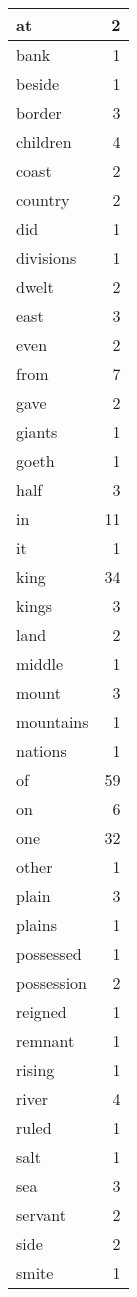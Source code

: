 \begin{center}
\begin{longtable}{l|r}
at & 2 \\ \hline
bank & 1 \\ \hline
beside & 1 \\ \hline
border & 3 \\ \hline
children & 4 \\ \hline
coast & 2 \\ \hline
country & 2 \\ \hline
did & 1 \\ \hline
divisions & 1 \\ \hline
dwelt & 2 \\ \hline
east & 3 \\ \hline
even & 2 \\ \hline
from & 7 \\ \hline
gave & 2 \\ \hline
giants & 1 \\ \hline
goeth & 1 \\ \hline
half & 3 \\ \hline
in & 11 \\ \hline
it & 1 \\ \hline
king & 34 \\ \hline
kings & 3 \\ \hline
land & 2 \\ \hline
middle & 1 \\ \hline
mount & 3 \\ \hline
mountains & 1 \\ \hline
nations & 1 \\ \hline
of & 59 \\ \hline
on & 6 \\ \hline
one & 32 \\ \hline
other & 1 \\ \hline
plain & 3 \\ \hline
plains & 1 \\ \hline
possessed & 1 \\ \hline
possession & 2 \\ \hline
reigned & 1 \\ \hline
remnant & 1 \\ \hline
rising & 1 \\ \hline
river & 4 \\ \hline
ruled & 1 \\ \hline
salt & 1 \\ \hline
sea & 3 \\ \hline
servant & 2 \\ \hline
side & 2 \\ \hline
smite & 1 \\ \hline

\end{longtable}
\end{center}
